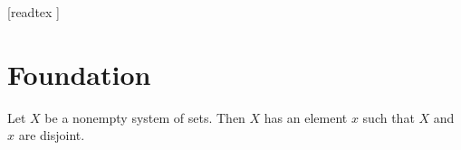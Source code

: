 \documentclass[10pt]{article}
\begin{document}
  \begin{imports}
    \begin{forthel}
      [readtex ]
    \end{forthel}
  \end{imports}


  \section{Foundation}

  \begin{forthel}
    \begin{axiom}[Foundation]
      Let $X$ be a nonempty system of sets.
      Then $X$ has an element $x$ such that $X$ and $x$ are disjoint.
    \end{axiom}
  \end{forthel}
\end{document}
